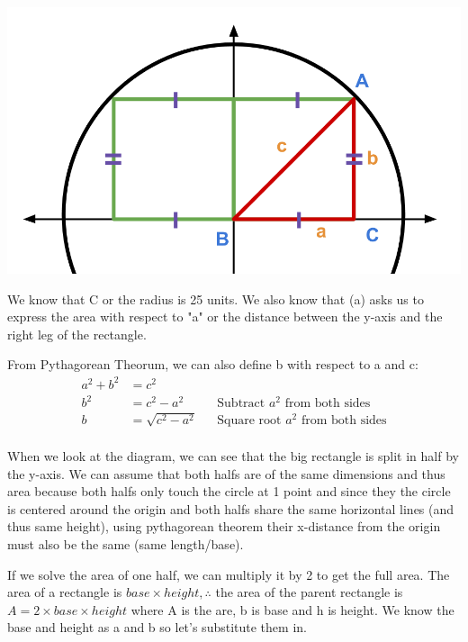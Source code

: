 \documentclass[12pt]{book}
\begin{document}
\begin{enumerate}
\begin{center}
    \includegraphics[scale = 0.25]{A3-3 Diagram.png}
\end{center}

\vspace{0.3cm}
We know that C or the radius is 25 units. We also know that (a) 
asks us to express the area with respect to "a" or the distance 
between the y-axis and the right leg of the rectangle.

From Pythagorean Theorum, we can also define b with respect to a and c:
\begin{align*}
    a^2 + b^2 &= c^2 \\
    b^2 &= c^2 - a^2 && \text{Subtract } a^2 \text{ from both sides}\\
    b &= \sqrt{c^2 - a^2} && \text{Square root } a^2 \text{ from both sides}\\
\end{align*}

\vspace{-0.5cm}
When we look at the diagram, we can see that the big rectangle is split in 
half by the y-axis. We can assume that both halfs are of the same dimensions 
and thus area because both halfs only touch the circle at 1 point and since 
they the circle is centered around the origin and both halfs share the same 
horizontal lines (and thus same height), using pythagorean theorem their 
x-distance from the origin must also be the same (same length/base).

\vspace{0.3cm}
If we solve the area of one half, we can multiply it by 2 to get the full area. 
The area of a rectangle is $base \times height, \therefore$ the area of the parent rectangle 
is $A = 2\times base \times height$ where A is the are, b is base and h is height. We know the base and height as a and b 
so let's substitute them in. 


\end{enumerate}
\end{document}
